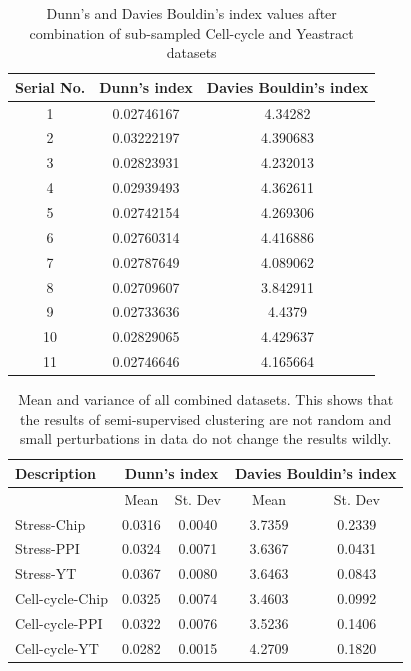\begin{table}[p]
\centering
\begin{tabular}{|c|c|c|}
\hline
Serial No. & Dunn's index  & Davies Bouldin's index\\
\hline
1 & 0.02746167 & 4.34282 \\
2 & 0.03222197 & 4.390683 \\
3 & 0.02823931 &  4.232013 \\
4 & 0.02939493 &  4.362611 \\
5 & 0.02742154 & 4.269306 \\
6 & 0.02760314 & 4.416886 \\
7 & 0.02787649 & 4.089062 \\
8 & 0.02709607 & 3.842911 \\
9 & 0.02733636 & 4.4379 \\
10 & 0.02829065 & 4.429637 \\
11 & 0.02746646 &  4.165664 \\
\hline 
\end{tabular}
\caption{Dunn's and Davies Bouldin's index values after combination of sub-sampled Cell-cycle and Yeastract datasets}
\label{tab:ccycle_yt_perturbed}
\end{table}

\begin{table}
\centering
\begin{tabular}{|l|c|c|c|c|}
\hline
Description & \multicolumn{2}{|c|}{Dunn's index}  & \multicolumn{2}{|c|}{Davies Bouldin's index}\\
\hline
 & Mean & St. Dev & Mean & St. Dev\\
\hline
Stress-Chip & 0.0316 & 0.0040 & 3.7359 & 0.2339 \\
Stress-PPI & 0.0324 & 0.0071 & 3.6367 & 0.0431 \\
Stress-YT & 0.0367 & 0.0080 & 3.6463 & 0.0843 \\

\hline
Cell-cycle-Chip & 0.0325 & 0.0074 & 3.4603 & 0.0992 \\
Cell-cycle-PPI & 0.0322 & 0.0076 & 3.5236 & 0.1406 \\
Cell-cycle-YT & 0.0282 & 0.0015 & 4.2709 & 0.1820 \\
\hline 
\end{tabular}
\caption{Mean and variance of all combined datasets. This shows that the results of semi-supervised clustering are not random and small perturbations in data do not change the results wildly.}
\label{tab:mean_stdev_combined_perturbed}
\end{table}

